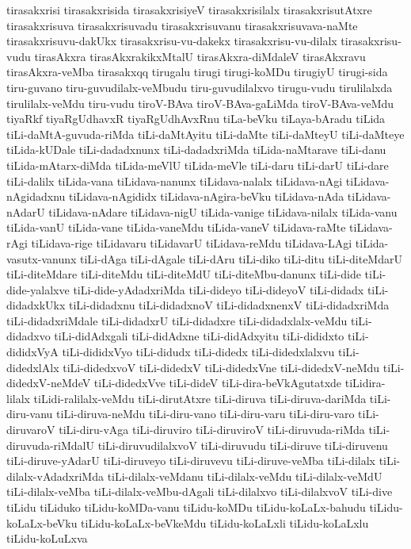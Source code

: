 {tirasakxrisi
tirasakxrisida
tirasakxrisiyeV
tirasakxrisilalx
tirasakxrisutAtxre
tirasakxrisuva
tirasakxrisuvadu
tirasakxrisuvanu
tirasakxrisuvava-naMte
tirasakxrisuvu-dakUkx
tirasakxrisu-vu-dakekx
tirasakxrisu-vu-dilalx
tirasakxrisu-vudu
tirasAkxra
tirasAkxrakikxMtalU
tirasAkxra-diMdaleV
tirasAkxravu
tirasAkxra-veMba
tirasakxqq
tirugalu
tirugi
tirugi-koMDu
tirugiyU
tirugi-sida
tiru-guvano
tiru-guvudilalx-veMbudu
tiru-guvudilalxvo
tirugu-vudu
tirulilalxda
tirulilalx-veMdu
tiru-vudu
tiroV-BAva
tiroV-BAva-gaLiMda
tiroV-BAva-veMdu
tiyaRkf
tiyaRgUdhavxR
tiyaRgUdhAvxRnu
tiLa-beVku
tiLaya-bAradu
tiLida
tiLi-daMtA-guvuda-riMda
tiLi-daMtAyitu
tiLi-daMte
tiLi-daMteyU
tiLi-daMteye
tiLida-kUDale
tiLi-dadadxnunx
tiLi-dadadxriMda
tiLida-naMtarave
tiLi-danu
tiLida-mAtarx-diMda
tiLida-meVlU
tiLida-meVle
tiLi-daru
tiLi-darU
tiLi-dare
tiLi-dalilx
tiLida-vana
tiLidava-nanunx
tiLidava-nalalx
tiLidava-nAgi
tiLidava-nAgidadxnu
tiLidava-nAgididx
tiLidava-nAgira-beVku
tiLidava-nAda
tiLidava-nAdarU
tiLidava-nAdare
tiLidava-nigU
tiLida-vanige
tiLidava-nilalx
tiLida-vanu
tiLida-vanU
tiLida-vane
tiLida-vaneMdu
tiLida-vaneV
tiLidava-raMte
tiLidava-rAgi
tiLidava-rige
tiLidavaru
tiLidavarU
tiLidava-reMdu
tiLidava-LAgi
tiLida-vasutx-vanunx
tiLi-dAga
tiLi-dAgale
tiLi-dAru
tiLi-diko
tiLi-ditu
tiLi-diteMdarU
tiLi-diteMdare
tiLi-diteMdu
tiLi-diteMdU
tiLi-diteMbu-danunx
tiLi-dide
tiLi-dide-yalalxve
tiLi-dide-yAdadxriMda
tiLi-dideyo
tiLi-dideyoV
tiLi-didadx
tiLi-didadxkUkx
tiLi-didadxnu
tiLi-didadxnoV
tiLi-didadxnenxV
tiLi-didadxriMda
tiLi-didadxriMdale
tiLi-didadxrU
tiLi-didadxre
tiLi-didadxlalx-veMdu
tiLi-didadxvo
tiLi-didAdxgali
tiLi-didAdxne
tiLi-didAdxyitu
tiLi-dididxto
tiLi-dididxVyA
tiLi-dididxVyo
tiLi-didudx
tiLi-didedx
tiLi-didedxlalxvu
tiLi-didedxlAlx
tiLi-didedxvoV
tiLi-didedxV
tiLi-didedxVne
tiLi-didedxV-neMdu
tiLi-didedxV-neMdeV
tiLi-didedxVve
tiLi-dideV
tiLi-dira-beVkAgutatxde
tiLidira-lilalx
tiLidi-ralilalx-veMdu
tiLi-dirutAtxre
tiLi-diruva
tiLi-diruva-dariMda
tiLi-diru-vanu
tiLi-diruva-neMdu
tiLi-diru-vano
tiLi-diru-varu
tiLi-diru-varo
tiLi-diruvaroV
tiLi-diru-vAga
tiLi-diruviro
tiLi-diruviroV
tiLi-diruvuda-riMda
tiLi-diruvuda-riMdalU
tiLi-diruvudilalxvoV
tiLi-diruvudu
tiLi-diruve
tiLi-diruvenu
tiLi-diruve-yAdarU
tiLi-diruveyo
tiLi-diruvevu
tiLi-diruve-veMba
tiLi-dilalx
tiLi-dilalx-vAdadxriMda
tiLi-dilalx-veMdanu
tiLi-dilalx-veMdu
tiLi-dilalx-veMdU
tiLi-dilalx-veMba
tiLi-dilalx-veMbu-dAgali
tiLi-dilalxvo
tiLi-dilalxvoV
tiLi-dive
tiLidu
tiLiduko
tiLidu-koMDa-vanu
tiLidu-koMDu
tiLidu-koLaLx-bahudu
tiLidu-koLaLx-beVku
tiLidu-koLaLx-beVkeMdu
tiLidu-koLaLxli
tiLidu-koLaLxlu
tiLidu-koLuLxva
}
